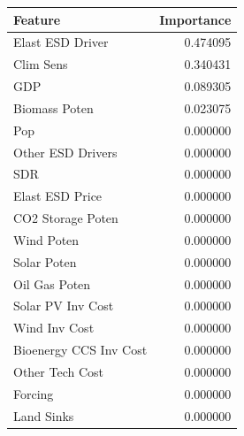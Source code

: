 \begin{tabular}{lr}
\toprule
Feature & Importance \\
\midrule
Elast ESD Driver & 0.474095 \\
Clim Sens & 0.340431 \\
GDP & 0.089305 \\
Biomass Poten & 0.023075 \\
Pop & 0.000000 \\
Other ESD Drivers & 0.000000 \\
SDR & 0.000000 \\
Elast ESD Price & 0.000000 \\
CO2 Storage Poten & 0.000000 \\
Wind Poten & 0.000000 \\
Solar Poten & 0.000000 \\
Oil Gas Poten & 0.000000 \\
Solar PV Inv Cost & 0.000000 \\
Wind Inv Cost & 0.000000 \\
Bioenergy CCS Inv Cost & 0.000000 \\
Other Tech Cost & 0.000000 \\
Forcing & 0.000000 \\
Land Sinks & 0.000000 \\
\bottomrule
\end{tabular}
